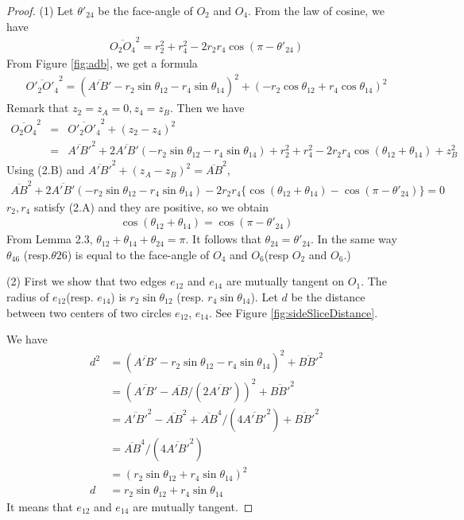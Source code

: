 \documentclass[dvipdfmx]{interact}
\theoremstyle{plain}%
\theoremstyle{definition}
\theoremstyle{remark}
\theoremstyle{problemstyle}
\begin{document}
 
\begin{proof}
 (1) Let $\theta'_{24}$ be the face-angle of $O_2$ and $O_4$. From the
 law of cosine, we have
 \begin{eqnarray}
  \overline{O_2O_4}^2 = r_2^2 + r_4^2 - 2r_2r_4\cos(\pi-\theta'_{24})
 \end{eqnarray}
From Figure \ref{fig:adb}, we get a formula
\begin{eqnarray*}
 \overline{O'_2O'_4}^2 = (\overline{A'B'} - r_2\sin\theta_{12}-
  r_4\sin\theta_{14})^2 + (-r_2\cos\theta_{12} + r_4 \cos \theta_{14})^2
\end{eqnarray*}
 Remark that $z_2 = z_A= 0, z_4 = z_B$. Then we have
\begin{eqnarray*}
 \overline{O_2O_4}^2 &=& \overline{O'_2O'_4}^2 + (z_2-z_4)^2\\
 &=&\overline{A'B'}^2 + 2 \overline{A'B'}(-r_2\sin\theta_{12} -
  r_4\sin\theta_{14}) + r^2_2 + r^2_4 -2r_2r_4\cos(\theta_{12} +
  \theta_{14}) + z^2_B
\end{eqnarray*}
Using (2.B) and $\overline{A'B'}^2 + (z_A-z_B)^2 = \overline{AB}^2$,
\begin{eqnarray*}
 \overline{AB}^2 + 2\overline{A'B'}(-r_2\sin\theta_{12} -
  r_4\sin\theta_{14}) - 2r_2r_4\{\cos(\theta_{12} + \theta_{14}) -
  \cos(\pi- \theta'_{24})\} = 0
\end{eqnarray*}
 $r_2, r_4$ satisfy (2.A) and they are positive, so we obtain
\begin{eqnarray*}
 \cos(\theta_{12} + \theta_{14}) = \cos(\pi - \theta'_{24})
\end{eqnarray*}
From Lemma 2.3, $\theta_{12} + \theta_{14} + \theta_{24} = \pi$. It
 follows that $\theta_24 = \theta'_24$. In the same way $\theta_{46}$
 (resp.$\theta{26}$) is equal to the face-angle of $O_4$ and $O_6$(resp
 $O_2$ and $O_6$.)

(2) First we show that two edges $e_{12}$ and $e_{14}$ are mutually tangent
 on $O_1$. The radius of $e_{12}$(resp. $e_{14}$) is
 $r_2\sin\theta_{12}$ (resp. $r_4\sin\theta_{14}$). Let $d$ be the
 distance between two centers of two circles $e_{12}$, $e_{14}$. See
 Figure \ref{fig:sideSliceDistance}.

We have
 \begin{align*}
d^2&= (\overline{A'B'} - r_2\sin\theta_{12}-r_4\sin\theta_{14})^2 + \overline{BB'}^2\\
&= (\overline{A'B'} - \overline{AB}/(2\overline{A'B'}))^2 + \overline{BB'}^2\\
&= \overline{A'B'}^2 - \overline{AB}^2
  +\overline{AB}^4/(4\overline{A'B'}^2) + \overline{BB'}^2\\
&= \overline{AB}^4 / (4 \overline{A'B'}^2)\\
&=(r_2\sin\theta_{12} + r_4\sin\theta_{14})^2\\
d&= r_2\sin\theta_{12} + r_4\sin\theta_{14}
 \end{align*}
It means that $e_{12}$ and $e_{14}$ are mutually tangent.


\end{proof}
\end{document}
